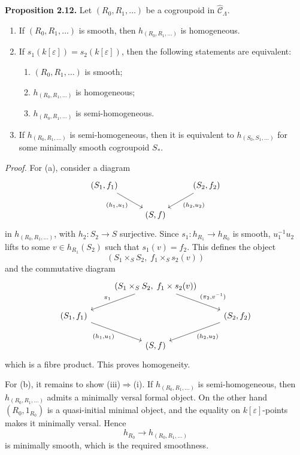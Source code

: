 \documentclass[11pt]{article}
\begin{document}
\textbf{Proposition 2.12.} Let \((R_0,R_1,\ldots)\) be a cogroupoid in
\(\widehat{\mathcal C}_\Lambda\).
\begin{enumerate}[label=(\alph*)]
\item If \((R_0,R_1,\ldots)\) is smooth, then \(h_{(R_0,R_1,\ldots)}\) is homogeneous.
\item If \(s_1(k[\varepsilon])=s_2(k[\varepsilon])\), then the following statements are equivalent:
\begin{enumerate}[label=(\roman*)]
\item \((R_0,R_1,\ldots)\) is smooth;
\item \(h_{(R_0,R_1,\ldots)}\) is homogeneous;
\item \(h_{(R_0,R_1,\ldots)}\) is semi-homogeneous.
\end{enumerate}
\item If \(h_{(R_0,R_1,\ldots)}\) is semi-homogeneous, then it is equivalent to
\(h_{(S_0,S_1,\ldots)}\) for some minimally smooth cogroupoid \(S_\ast\).
\end{enumerate}

\emph{Proof.} For (a), consider a diagram
\[
\begin{tikzcd}
(S_1,f_1) \arrow[dr,"{(h_1,u_1)}"'] && (S_2,f_2) \arrow[dl,"{(h_2,u_2)}"]\\
& (S,f) &
\end{tikzcd}
\]
in \(h_{(R_0,R_1,\ldots)}\), with \(h_2:S_2\to S\) surjective. Since
\(s_1:h_{R_1}\to h_{R_0}\) is smooth, \(u_1^{-1}u_2\) lifts to some
\(v\in h_{R_1}(S_2)\) such that \(s_1(v)=f_2\). This defines the object
\[
 (S_1\times_S S_2,\; f_1\times_S s_2(v))
\]
and the commutative diagram
\[
\begin{tikzcd}
& (S_1\times_S S_2,\; f_1\times s_2(v))
   \arrow[dl,"\pi_1"'] \arrow[dr,"{(\pi_2,v^{-1})}"] &\\
(S_1,f_1)\arrow[dr,"{(h_1,u_1)}"'] &&
(S_2,f_2)\arrow[dl,"{(h_2,u_2)}"]\\
& (S,f) &
\end{tikzcd}
\]
which is a fibre product. This proves homogeneity.

For (b), it remains to show (iii)\(\Rightarrow\)(i). If \(h_{(R_0,R_1,\ldots)}\) is
semi-homogeneous, then \(h_{(R_0,R_1,\ldots)}\) admits a minimally versal formal object.
On the other hand \((R_0,1_{R_0})\) is a quasi-initial minimal object, and the equality on
\(k[\varepsilon]\)-points makes it minimally versal. Hence
\[
 h_{R_0}\longrightarrow h_{(R_0,R_1,\ldots)}
\]
is minimally smooth, which is the required smoothness.
\end{document}
